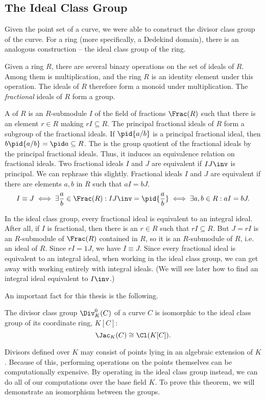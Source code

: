 \subsection{The Ideal Class Group}

Given the point set of a curve, we were able to construct the divisor class group of the curve.
For a ring (more specifically, a Dedekind domain), there is an analogous construction -- the ideal class group of the ring.

Given a ring $R$, there are several binary operations on the set of ideals of $R$.
Among them is multiplication, and the ring $R$ is an identity element under this operation.
The ideals of $R$ therefore form a monoid under multiplication.
The \emph{fractional} ideals of $R$ form a group.

A  of $R$ is an $R$-submodule $I$ of the field of fractions $\Frac(R)$
such that there is an element $r \in R$ making $rI \subseteq R$.
The principal fractional ideals of $R$ form a subgroup of the fractional ideals.
If $\pid {a/b}$ is a principal fractional ideal, then $b\pid{a/b} = \pid a \subseteq R$.
The  is the group quotient of the fractional ideals by the principal fractional ideals.
Thus, it induces an equivalence relation on fractional ideals.
Two fractional ideals $I$ and $J$ are equivalent if $IJ\inv$ is principal.
We can rephrase this slightly.
Fractional ideals $I$ and $J$ are equivalent if there are elements $a, b$ in $R$ such that $aI = bJ$.
  \[ I \equiv J \iff \exists \frac a b \in \Frac(R) : IJ\inv = \pid{\frac a b} \iff \exists a, b \in R : aI = bJ. \]

In the ideal class group, every fractional ideal is equivalent to an integral ideal. 
After all, if $I$ is fractional, then there is an $r \in R$ such that $rI \subseteq R$.
But $J = rI$ is an $R$-submodule of $\Frac (R)$ contained in $R$, so it is an $R$-submodule of $R$, i.e. an ideal of $R$.
Since $rI = 1J$, we have $I \equiv J$.
Since every fractional ideal is equivalent to an integral ideal, when working in the ideal class group,
we can get away with working entirely with integral ideals.
(We will see later how to find an integral ideal equivalent to $I\inv$.)

An important fact for this thesis is the following.
\begin{theorem}
  The divisor class group $\Div_K^0(C)$ of a curve $C$ is isomorphic to the ideal class group of its coordinate ring, $K[C]$:
    \[ \Jac_K(C) \cong \Cl(K[C]). \]
\end{theorem}
Divisors defined over $K$ may consist of points lying in an algebraic extension of $K$.
Because of this, performing operations on the points themselves can be computationally expensive.
By operating in the ideal class group instead, we can do all of our computations over the base field $K$.
To prove this theorem, we will demonstrate an isomorphism between the groups.

